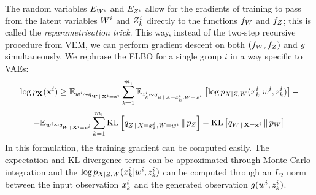 \documentclass[../thesis.tex]{subfiles}
\begin{document}
The random variables $\myrv{e}_{\myrv{w}^i}$ and $\myrv{e}_{\myrv{z}^i}$ allow for the gradients of training to pass from the latent variables $\myrv{w}^i$ and $\myrv{z}^i_k$ directly to the functions $\myfunc{f}_{\myrv{w}}$ and $\myfunc{f}_{\myrv{z}}$; this is called the \textit{reparametrisation trick}. This way, instead of the two-step recursive procedure from VEM, we can perform gradient descent on both $(\myfunc{f}_{\myrv{w}}, \myfunc{f}_{\myrv{z}})$ and $g$ simultaneously. We rephrase the ELBO for a single group $i$ in a way specific to VAEs:
\[
    \log \myfunc{p}_{\mygroup{\myrv{x}}} (\mygroup{\myvect{x}}^i) \geq \myexp{q}{\myvect{w}^i}{\myrv{w} \,|\, \mygroup{\myrv{x}}^i = \mygroup{\myvect{x}}^i} \sum_{k=1}^{\mycnt{m}_i} \myexp{q}{\myvect{z}^i_k}{\myrv{z} \,|\, \myrv{x} = \myvect{x}^i_k, \myrv{w} = \myvect{w}^i} \left[ \log \myfunc{p}_{\myrv{x} | \myrv{z}, \myrv{w}} (\myvect{x}^i_k | \myvect{w}^i, \myvect{z}^i_k) \right] - 
\]
\[
    - \myexp{q}{\myvect{w}^i}{\myrv{w} \,|\, \mygroup{\myrv{x}}^i = \mygroup{\myvect{x}}^i} \sum_{k=1}^{\mycnt{m}_i} \mathrm{KL} \left[ \myfunc{q}_{\myrv{z} \,|\, \myrv{x} = \myvect{x}^i_k, \myrv{w} = \myvect{w}^i} \,\|\, \myfunc{p}_{\myrv{z}} \right] - \mathrm{KL} \left[ \myfunc{q}_{\myrv{w} \,|\, \mygroup{\myrv{x}} = \mygroup{\myvect{x}}^i} \,\|\, \myfunc{p}_{\myrv{w}} \right]
\]
In this formulation, the training gradient can be computed easily. The expectation and $\mathrm{KL}$-divergence terms can be approximated through Monte Carlo integration and the $\log \myfunc{p}_{\myrv{x} | \myrv{z}, \myrv{w}} (\myvect{x}^i_k | \myvect{w}^i, \myvect{z}^i_k)$ can be computed through an $L_2$ norm between the input observation $x^i_k$ and the generated observation $g (w^i, z^i_k)$.
\end{document}
